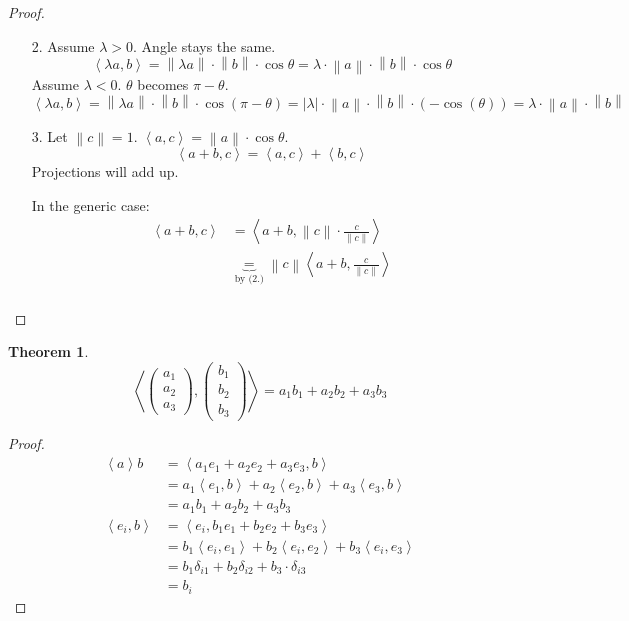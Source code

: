 \documentclass{article}
\newtheorem{theorem}{Theorem}  \numberwithin{theorem}{section}
\newcommand{\angel}[1]{\left\langle#1\right\rangle}
\newcommand{\norm}[1]{\left\|#1\right\|}
\newcommand{\card}[1]{\left|#1\right|}
\begin{document}
\begin{proof}
  \begin{enumerate}
    \item[2.]
      Assume $\lambda > 0$. Angle stays the same.
      \[ \angel{\lambda a, b} = \norm{\lambda a} \cdot \norm{b} \cdot \cos\theta = \lambda \cdot \norm{a} \cdot \norm{b} \cdot \cos\theta \]
      Assume $\lambda < 0$. $\theta$ becomes $\pi - \theta$.
      \[ \angel{\lambda a, b} = \norm{\lambda a} \cdot \norm{b} \cdot \cos(\pi - \theta) = \card{\lambda} \cdot \norm{a} \cdot \norm{b} \cdot (-\cos(\theta)) = \lambda \cdot \norm a \cdot \norm b \]
    \item[3.]
      Let $\norm{c} = 1$. $\angel{a,c} = \norm a \cdot \cos\theta$.
      \[ \angel{a+b, c} = \angel{a,c} + \angel{b,c} \]
      Projections will add up.

      In the generic case:
      \begin{align*}
        \angel{a+b, c} &= \angel{a+b, \norm c \cdot \frac{c}{\norm{c}}} \\
          &\underbrace{=}_{\text{by (2.)}} \norm c \angel{a+b, \frac{c}{\norm{c}}} \\
      \end{align*}
  \end{enumerate}
\end{proof}

\begin{theorem} %
  \[ \angel{\begin{pmatrix} a_1 \\ a_2 \\ a_3 \end{pmatrix}, \begin{pmatrix} b_1 \\ b_2 \\ b_3 \end{pmatrix}} = a_1 b_1 + a_2 b_2 + a_3 b_3 \]
\end{theorem}

\begin{proof}
  \begin{align*}
    \angel{a}{b} &= \angel{a_1 e_1 + a_2 e_2 + a_3 e_3, b} \\
      &= a_1 \angel{e_1, b} + a_2 \angel{e_2, b} + a_3 \angel{e_3, b} \\
      &= a_1 b_1 + a_2 b_2 + a_3 b_3 \\
    \angel{e_i,b} &= \angel{e_i, b_1 e_1 + b_2 e_2 + b_3 e_3} \\
      &= b_1 \angel{e_i, e_1} + b_2 \angel{e_i, e_2} + b_3 \angel{e_i, e_3} \\
      &= b_1 \delta_{i1} + b_2 \delta_{i2} + b_3 \cdot \delta_{i3} \\
      &= b_i
  \end{align*}
\end{proof}
\end{document}
